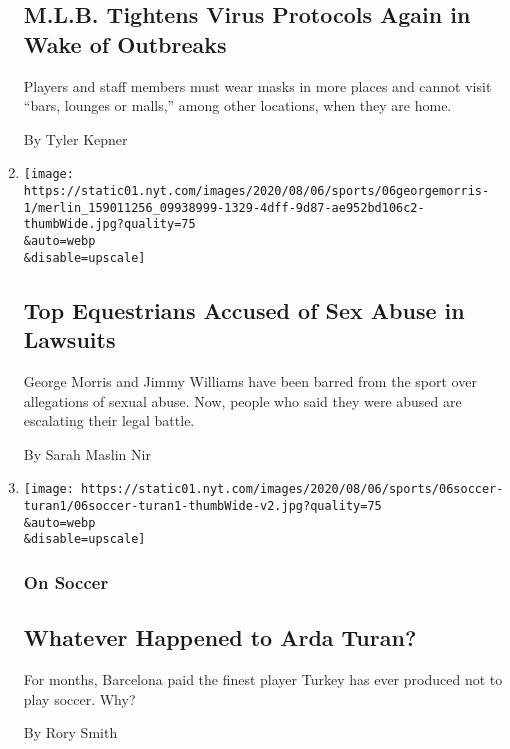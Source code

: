 \begin{enumerate}
{  \subsection{M.L.B. Tightens Virus Protocols Again in Wake of
  Outbreaks}\label{mlb-tightens-virus-protocols-again-in-wake-of-outbreaks}}

  Players and staff members must wear masks in more places and cannot
  visit ``bars, lounges or malls,'' among other locations, when they are
  home.

  By Tyler Kepner
\item
  \href{/2020/08/06/sports/equestrian-sexual-abuse-george-morris.html}{}

  \texttt{[image: https://static01.nyt.com/images/2020/08/06/sports/06georgemorris-1/merlin\_159011256\_09938999-1329-4dff-9d87-ae952bd106c2-thumbWide.jpg?quality=75\\\&auto=webp\\\&disable=upscale]}

  \hypertarget{top-equestrians-accused-of-sex-abuse-in-lawsuits}{%
  \subsection{Top Equestrians Accused of Sex Abuse in
  Lawsuits}\label{top-equestrians-accused-of-sex-abuse-in-lawsuits}}

  George Morris and Jimmy Williams have been barred from the sport over
  allegations of sexual abuse. Now, people who said they were abused are
  escalating their legal battle.

  By Sarah Maslin Nir
\item
  \href{/2020/08/06/sports/soccer/arda-turan-galatasaray-barcelona.html}{}

  \texttt{[image: https://static01.nyt.com/images/2020/08/06/sports/06soccer-turan1/06soccer-turan1-thumbWide-v2.jpg?quality=75\\\&auto=webp\\\&disable=upscale]}

  \hypertarget{on-soccer}{%
  \subsubsection{On Soccer}\label{on-soccer}}

  \hypertarget{whatever-happened-to-arda-turan}{%
  \subsection{Whatever Happened to Arda
  Turan?}\label{whatever-happened-to-arda-turan}}

  For months, Barcelona paid the finest player Turkey has ever produced
  not to play soccer. Why?

  By Rory Smith
\end{enumerate}


